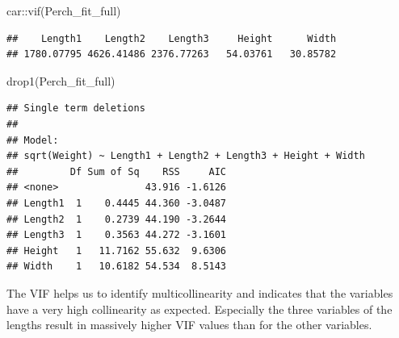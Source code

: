 \documentclass[
]{article}
\newenvironment{Shaded}{\begin{snugshade}}{\end{snugshade}}
\newcommand{\FunctionTok}[1]{\textcolor[rgb]{0.00,0.00,0.00}{#1}}
\newcommand{\NormalTok}[1]{#1}
\newcommand{\SpecialCharTok}[1]{\textcolor[rgb]{0.00,0.00,0.00}{#1}}
\begin{document}
\begin{Shaded}
\begin{Highlighting}[]
\NormalTok{car}\SpecialCharTok{::}\FunctionTok{vif}\NormalTok{(Perch\_fit\_full)}
\end{Highlighting}
\end{Shaded}

\begin{verbatim}
##    Length1    Length2    Length3     Height      Width 
## 1780.07795 4626.41486 2376.77263   54.03761   30.85782
\end{verbatim}

\begin{Shaded}
\begin{Highlighting}[]
\FunctionTok{drop1}\NormalTok{(Perch\_fit\_full)}
\end{Highlighting}
\end{Shaded}

\begin{verbatim}
## Single term deletions
## 
## Model:
## sqrt(Weight) ~ Length1 + Length2 + Length3 + Height + Width
##         Df Sum of Sq    RSS     AIC
## <none>               43.916 -1.6126
## Length1  1    0.4445 44.360 -3.0487
## Length2  1    0.2739 44.190 -3.2644
## Length3  1    0.3563 44.272 -3.1601
## Height   1   11.7162 55.632  9.6306
## Width    1   10.6182 54.534  8.5143
\end{verbatim}

The VIF helps us to identify multicollinearity and indicates that the
variables have a very high collinearity as expected. Especially the
three variables of the lengths result in massively higher VIF values
than for the other variables.
\end{document}
